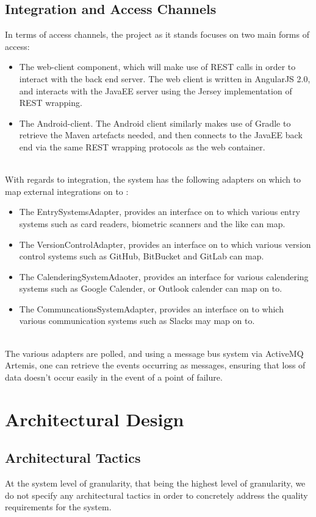 \documentclass[11pt,a4paper]{article}
\begin{document}
\subsection{Integration and Access Channels}
In terms of access channels, the project as it stands focuses on two main forms of access:
\begin{itemize}
	\item The web-client component, which will make use of REST calls in order to interact with the back end server. The web client is written in AngularJS 2.0, and interacts with the JavaEE server using the Jersey implementation of REST wrapping.
	\item The Android-client. The Android client similarly makes use of Gradle to retrieve the Maven artefacts needed, and then connects to the JavaEE back end via the same REST wrapping protocols as the web container.\\\\
\end{itemize}
With regards to integration, the system has the following adapters on which to map external integrations on to :
\begin{itemize}
	\item The EntrySystemsAdapter, provides an interface on to which various entry systems such as card readers, biometric scanners and the like can map.
	\item The VersionControlAdapter, provides an interface on to which various version control systems such as GitHub, BitBucket and GitLab can map.
	\item The CalenderingSystemAdaoter, provides an interface for various calendering systems such as Google Calender, or Outlook calender can map on to.
	\item The CommuncationsSystemAdapter, provides an interface on to which various communication systems such as Slacks may map on to.\\\\
\end{itemize}
The various adapters are polled, and using a message bus system via ActiveMQ Artemis, one can retrieve the events occurring as messages, ensuring that loss of data doesn't occur easily in the event of a point of failure.

\pagebreak

\section{Architectural Design}
\subsection{Architectural Tactics}
At the system level of granularity, that being the highest level of granularity, we do not specify any architectural tactics in order to concretely address the quality requirements for the system.
\end{document}

